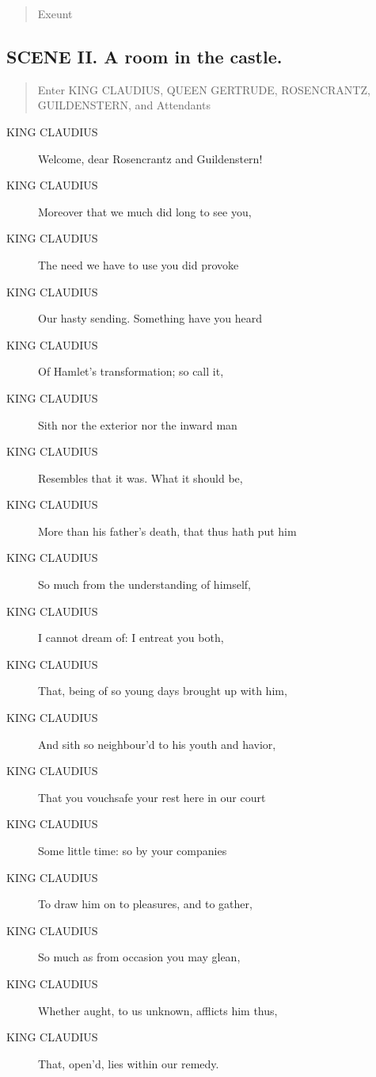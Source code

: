 \documentclass{article}
\begin{document}
\begin{quote}
Exeunt
\end{quote}
          
\subsection{SCENE II.  A room in the castle.}
          
\begin{quote}
Enter KING CLAUDIUS, QUEEN GERTRUDE, ROSENCRANTZ,
GUILDENSTERN, and Attendants
\end{quote}
          
\begin{description}
            
\item[KING CLAUDIUS] Welcome, dear Rosencrantz and Guildenstern!
\item[KING CLAUDIUS] Moreover that we much did long to see you,
\item[KING CLAUDIUS] The need we have to use you did provoke
\item[KING CLAUDIUS] Our hasty sending. Something have you heard
\item[KING CLAUDIUS] Of Hamlet's transformation; so call it,
\item[KING CLAUDIUS] Sith nor the exterior nor the inward man
\item[KING CLAUDIUS] Resembles that it was. What it should be,
\item[KING CLAUDIUS] More than his father's death, that thus hath put him
\item[KING CLAUDIUS] So much from the understanding of himself,
\item[KING CLAUDIUS] I cannot dream of: I entreat you both,
\item[KING CLAUDIUS] That, being of so young days brought up with him,
\item[KING CLAUDIUS] And sith so neighbour'd to his youth and havior,
\item[KING CLAUDIUS] That you vouchsafe your rest here in our court
\item[KING CLAUDIUS] Some little time: so by your companies
\item[KING CLAUDIUS] To draw him on to pleasures, and to gather,
\item[KING CLAUDIUS] So much as from occasion you may glean,
\item[KING CLAUDIUS] Whether aught, to us unknown, afflicts him thus,
\item[KING CLAUDIUS] That, open'd, lies within our remedy.
\end{description}
          
\end{document}
